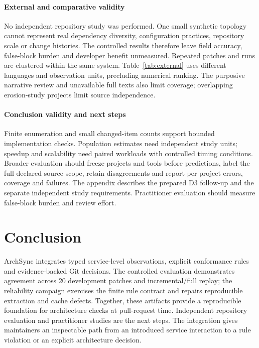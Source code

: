 \paragraph{External and comparative validity} No independent repository study was performed. One small synthetic topology cannot represent real dependency diversity, configuration practices, repository scale or change histories. The controlled results therefore leave field accuracy, false-block burden and developer benefit unmeasured. Repeated patches and runs are clustered within the same system. Table~\ref{tab:external} uses different languages and observation units, precluding numerical ranking. The purposive narrative review and unavailable full texts also limit coverage; overlapping erosion-study projects limit source independence.

\paragraph{Conclusion validity and next steps} Finite enumeration and small changed-item counts support bounded implementation checks. Population estimates need independent study units; speedup and scalability need paired workloads with controlled timing conditions. Broader evaluation should freeze projects and tools before predictions, label the full declared source scope, retain disagreements and report per-project errors, coverage and failures. The appendix describes the prepared D3 follow-up and the separate independent study requirements. Practitioner evaluation should measure false-block burden and review effort.

\section{Conclusion}
ArchSync integrates typed service-level observations, explicit conformance rules and evidence-backed Git decisions. The controlled evaluation demonstrates agreement across 20 development patches and incremental/full replay; the reliability campaign exercises the finite rule contract and repairs reproducible extraction and cache defects. Together, these artifacts provide a reproducible foundation for architecture checks at pull-request time. Independent repository evaluation and practitioner studies are the next steps. The integration gives maintainers an inspectable path from an introduced service interaction to a rule violation or an explicit architecture decision.



\ifdefined\compactprofile\else\fi

